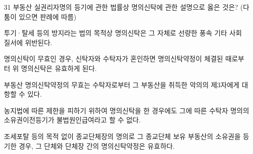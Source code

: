 \begin{question}{31}
부동산 실권리자명의 등기에 관한 법률상 명의신탁에 관한 설명으로 옳은 것은? (다툼이 있으면 판례에 따름)
\begin{choices}
  \item 투기·탈세 등의 방지라는 법의 목적상 명의신탁은 그 자체로 선량한 풍속 기타 사회 질서에 위반된다.
  \item 명의신탁이 무효인 경우, 신탁자와 수탁자가 혼인하면 명의신탁약정이 체결된 때로부터 위 명의신탁은 유효하게 된다.
  \item 부동산 명의신탁약정의 무효는 수탁자로부터 그 부동산을 취득한 악의의 제3자에게 대항할 수 있다.
  \item 농지법에 따른 제한을 피하기 위하여 명의신탁을 한 경우에도 그에 따른 수탁자 명의의 소유권이전등기가 불법원인급여라고 할 수 없다.
  \item 조세포탈 등의 목적 없이 종교단체장의 명의로 그 종교단체 보유 부동산의 소유권을 등기한 경우, 그 단체와 단체장 간의 명의신탁약정은 유효하다.
\end{choices}
\end{question}
